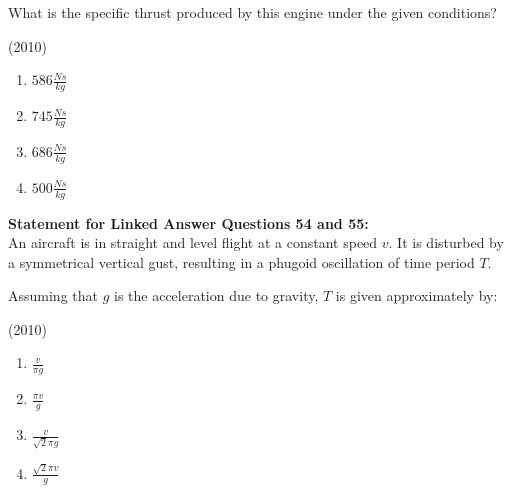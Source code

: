\iffalse
	\chapter{2010}
	\author{AI24BTECH11003}
	\section{ae}
\fi
 
    \item What is the specific thrust produced by this engine under the given conditions?
    
    \hfill{(2010)}

        \begin{multicols}{4}
            \begin{enumerate}
                \item $586\frac{Ns}{kg}$
                \item $745\frac{Ns}{kg}$
                \item $686\frac{Ns}{kg}$
                \item $500\frac{Ns}{kg}$
            \end{enumerate}
        \end{multicols}

    \item[] \textbf{Statement for Linked Answer Questions 54 and 55:}\\
    An aircraft is in straight and level flight at a constant speed $v$. It is disturbed by a symmetrical vertical gust, resulting in a phugoid oscillation of time period $T$.\\

    \item Assuming that $g$ is the acceleration due to gravity, $T$ is given approximately by:
    
    \hfill{(2010)}

        \begin{multicols}{4}
            \begin{enumerate}
                \item $\frac{v}{\pi g}$
                \item $\frac{\pi v}{g}$
                \item $\frac{v}{\sqrt{2}\pi g}$
                \item $\frac{\sqrt{2}\pi v}{g}$
            \end{enumerate}
        \end{multicols}

